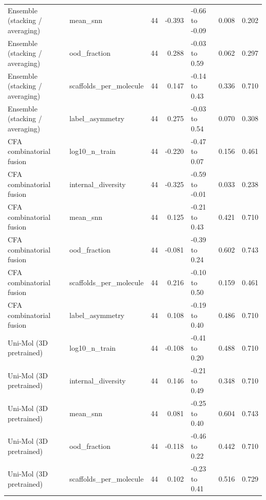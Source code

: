 \begin{landscape}
\begin{xltabular}{\linewidth}{@{}>{\raggedright\arraybackslash{}\hsize}X>{\raggedright\arraybackslash{}\hsize}Xrr>{\raggedright\arraybackslash{}\hsize}Xrr@{}}
Ensemble (stacking /\allowbreak{} averaging) & mean\_\allowbreak{}snn & 44 & -\allowbreak{}0.393 & -\allowbreak{}0.66 to -\allowbreak{}0.09 & 0.008 & 0.202 \\
Ensemble (stacking /\allowbreak{} averaging) & ood\_\allowbreak{}fraction & 44 & 0.288 & -\allowbreak{}0.03 to 0.59 & 0.062 & 0.297 \\
Ensemble (stacking /\allowbreak{} averaging) & scaffolds\_\allowbreak{}per\_\allowbreak{}molecule & 44 & 0.147 & -\allowbreak{}0.14 to 0.43 & 0.336 & 0.710 \\
Ensemble (stacking /\allowbreak{} averaging) & label\_\allowbreak{}asymmetry & 44 & 0.275 & -\allowbreak{}0.03 to 0.54 & 0.070 & 0.308 \\
CFA combinatorial fusion & log10\_\allowbreak{}n\_\allowbreak{}train & 44 & -\allowbreak{}0.220 & -\allowbreak{}0.47 to 0.07 & 0.156 & 0.461 \\
CFA combinatorial fusion & internal\_\allowbreak{}diversity & 44 & -\allowbreak{}0.325 & -\allowbreak{}0.59 to -\allowbreak{}0.01 & 0.033 & 0.238 \\
CFA combinatorial fusion & mean\_\allowbreak{}snn & 44 & 0.125 & -\allowbreak{}0.21 to 0.43 & 0.421 & 0.710 \\
CFA combinatorial fusion & ood\_\allowbreak{}fraction & 44 & -\allowbreak{}0.081 & -\allowbreak{}0.39 to 0.24 & 0.602 & 0.743 \\
CFA combinatorial fusion & scaffolds\_\allowbreak{}per\_\allowbreak{}molecule & 44 & 0.216 & -\allowbreak{}0.10 to 0.50 & 0.159 & 0.461 \\
CFA combinatorial fusion & label\_\allowbreak{}asymmetry & 44 & 0.108 & -\allowbreak{}0.19 to 0.40 & 0.486 & 0.710 \\
Uni-\allowbreak{}Mol (3D pretrained) & log10\_\allowbreak{}n\_\allowbreak{}train & 44 & -\allowbreak{}0.108 & -\allowbreak{}0.41 to 0.20 & 0.488 & 0.710 \\
Uni-\allowbreak{}Mol (3D pretrained) & internal\_\allowbreak{}diversity & 44 & 0.146 & -\allowbreak{}0.21 to 0.49 & 0.348 & 0.710 \\
Uni-\allowbreak{}Mol (3D pretrained) & mean\_\allowbreak{}snn & 44 & 0.081 & -\allowbreak{}0.25 to 0.40 & 0.604 & 0.743 \\
Uni-\allowbreak{}Mol (3D pretrained) & ood\_\allowbreak{}fraction & 44 & -\allowbreak{}0.118 & -\allowbreak{}0.46 to 0.22 & 0.442 & 0.710 \\
Uni-\allowbreak{}Mol (3D pretrained) & scaffolds\_\allowbreak{}per\_\allowbreak{}molecule & 44 & 0.102 & -\allowbreak{}0.23 to 0.41 & 0.516 & 0.729 \\

\end{xltabular}
\end{landscape}
